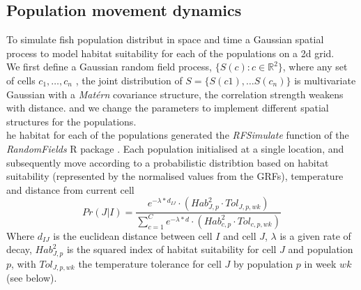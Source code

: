 \documentclass[review]{elsarticle}
\begin{document}
\subsection{Population movement dynamics}

To simulate  fish population
distribut in space and time a Gaussian spatial process  to
model habitat suitability for each of the populations on a 2d grid. \\

We first define a Gaussian random
field process, $\{S(c) :
c \in \mathbb{R}^2\}$,  where
 any set of cells $c_{1}, \dots, c_{n}$ , the joint distribution of $S =
\{S(c1),\dots S(c_{n})\}$ is multivariate Gaussian with a \textit{Matérn}
covariance structure,
 the correlation strength weakens with
distance.
 and we change the parameters to
implement different spatial structures for the populations. \\

he habitat for each of the
populations  generated 
the \textit{RFSimulate} function of the \textit{RandomFields} R package
\citep{Schlater2015}. Each population  initialised at
a single location, and subsequently move according to a
probabilistic distribtion based on habitat suitability
(represented by the normalised values from the GRFs), temperature and distance
from current cell 
\begin{equation}
	Pr(J | I) = \frac{e^{-\lambda * d_{IJ}} \cdot
		(Hab_{J,p}^2 \cdot Tol_{J,p,wk})}{\sum\limits_{c=1}^{C}e^{-\lambda * d} \cdot
		(Hab_{c,p}^2 \cdot Tol_{c,p,wk})}
\end{equation}
Where $d_{IJ}$ is the euclidean distance between cell $I$ and cell $J$,
$\lambda$ is a given rate of decay, $Hab_{J,p}^2$ is the squared index of
habitat suitability for cell $J$ and population $p$, with $Tol_{J,p,wk}$ the
temperature tolerance for cell $J$ by population $p$ in week $wk$ (see
below).\\
\end{document}
